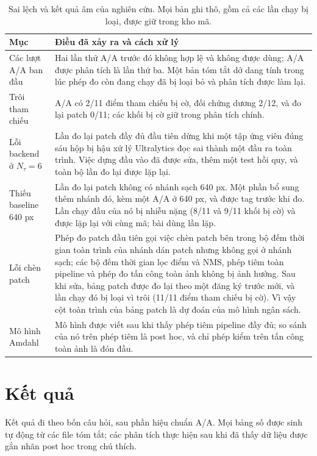 \documentclass[a4paper,fleqn]{cas-dc}
\newcommand{\Ntau}{N_{\tau}}
\begin{document}
\begin{table}[pos=!t]
\centering\small
\caption{Sai lệch và kết quả âm của nghiên cứu. Mọi bản ghi thô, gồm cả các lần chạy bị loại, được giữ trong kho mã.}
\label{tab:dev}
\begin{tabularx}{\textwidth}{@{}p{3.3cm}X@{}}
\toprule
Mục & Điều đã xảy ra và cách xử lý \\
\midrule
Các lượt A/A ban đầu & Hai lần thử A/A trước đó không hợp lệ và không được dùng; A/A được phân tích là lần thứ ba. Một bản tóm tắt dở dang tính trong lúc phép đo còn đang chạy đã bị loại bỏ và phân tích được làm lại. \\
Trôi tham chiếu & A/A có 2/11 điểm tham chiếu bị cờ, đối chứng dương 2/12, và đo lại patch 0/11; các khối bị cờ giữ trong phân tích chính. \\
Lỗi backend ở $\Ntau=6$ & Lần đo lại patch đầy đủ đầu tiên dừng khi một tập ứng viên đúng sáu hộp bị hậu xử lý Ultralytics đọc sai thành một đầu ra toàn trình. Việc dựng đầu vào đã được sửa, thêm một test hồi quy, và toàn bộ lần đo lại được lặp lại. \\
Thiếu baseline 640 px & Lần đo lại patch không có nhánh sạch 640 px. Một phần bổ sung thêm nhánh đó, kèm một A/A ở 640 px, và được tag trước khi đo. Lần chạy đầu của nó bị nhiễu nặng (8/11 và 9/11 khối bị cờ) và được lặp lại với cùng mã; bài dùng lần lặp. \\
Lỗi chèn patch & Phép đo patch đầu tiên gọi việc chèn patch bên trong bộ đếm thời gian toàn trình của nhánh dán patch nhưng không gọi ở nhánh sạch; các bộ đếm thời gian lọc điểm và NMS, phép tiêm toàn pipeline và phép đo tấn công toàn ảnh không bị ảnh hưởng. Sau khi sửa, bảng patch được đo lại theo một đăng ký trước mới, và lần chạy đó bị loại vì trôi (11/11 điểm tham chiếu bị cờ). Vì vậy cột toàn trình của bảng patch là dự đoán của mô hình ngân sách. \\
Mô hình Amdahl & Mô hình được viết sau khi thấy phép tiêm pipeline đầy đủ; so sánh của nó trên phép tiêm là post hoc, và chỉ phép kiểm trên tấn công toàn ảnh là đón đầu. \\
\bottomrule
\end{tabularx}
\end{table}

\section{Kết quả}
\label{sec:results}
Kết quả đi theo bốn câu hỏi, sau phần hiệu chuẩn A/A. Mọi bảng số được sinh tự động từ các file tóm tắt; các phân tích thực hiện sau khi đã thấy dữ liệu được gắn nhãn post hoc trong chú thích.
\end{document}
